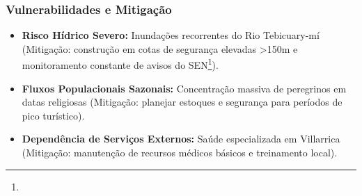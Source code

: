\subsubsection{Vulnerabilidades e
Mitigação}

\begin{itemize}
\tightlist
\item
  \textbf{Risco Hídrico Severo:} Inundações recorrentes do Rio
  Tebicuary-mí (Mitigação: construção em cotas de segurança elevadas
  \textgreater150m e monitoramento constante de avisos do SEN\footnote{\fineSEN}).
\item
  \textbf{Fluxos Populacionais Sazonais:} Concentração massiva de
  peregrinos em datas religiosas (Mitigação: planejar estoques e
  segurança para períodos de pico turístico).
\item
  \textbf{Dependência de Serviços Externos:} Saúde especializada em
  Villarrica (Mitigação: manutenção de recursos médicos básicos e
  treinamento local).
\end{itemize}

